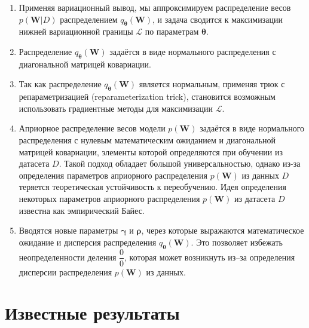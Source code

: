\documentclass{article}
\numberwithin{equation}{section}
\begin{document}
    \begin{enumerate}
        \item Применяя вариационный вывод,
            мы аппроксимируем распределение весов $p(\pmb{W}| D)$
            распределением $q_{\pmb{\theta}}(\pmb{W})$,
            и задача сводится к максимизации нижней вариационной границы
            $\mathcal{L}$ по параметрам $\pmb{\theta}$.
        \item Распределение $q_{\pmb{\theta}}(\pmb{W})$
            задаётся в виде нормального распределения с диагональной матрицей ковариации.
        \item Так как распределение $q_{\pmb{\theta}}(\pmb{W})$
            является нормальным, применяя трюк с репараметризацией
            (reparameterization trick),
            становится возможным использовать градиентные методы
            для максимизации $\mathcal{L}$.
        \item Априорное распределение весов модели $p(\pmb{W})$
            задаётся в виде нормального распределения с нулевым математическим ожиданием
            и диагональной матрицей ковариации,
            элементы которой определяются при обучении из датасета $D$.
            Такой подход обладает большой универсальностью,
            однако из-за определения параметров априорного распределения $p(\pmb{W})$
            из данных $D$ теряется теоретическая устойчивость к переобучению.
            Идея определения некоторых параметров априорного распределения
            $p(\pmb{W})$ из датасета $D$
            известна как эмпирический Байес.
        \item Вводятся новые параметры $\pmb{\gamma}$ и $\pmb{\rho}$,
            через которые выражаются математическое ожидание и дисперсия распределения
            $q_{\pmb{\theta}}(\pmb{W})$.
            Это позволяет избежать неопределенности деления $\dfrac{0}{0}$,
            которая может возникнуть из--за определения дисперсии распределения $p(\pmb{W})$ из данных.
    \end{enumerate}

    \section{Известные результаты}
\end{document}
